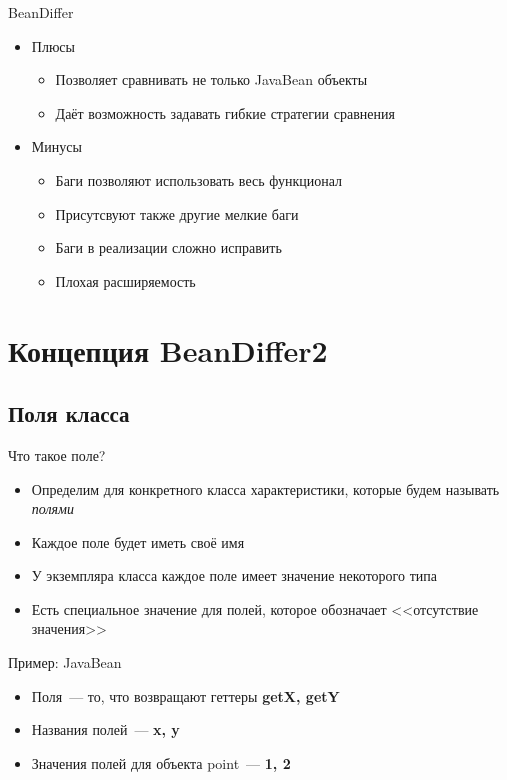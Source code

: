 \documentclass{beamer}
\begin{document}
\begin{frame}{BeanDiffer}
  \pause
  \begin{itemize}
    \item Плюсы
        \pause
        \begin{itemize}
            \item {Позволяет сравнивать не только JavaBean объекты \pause}
            \item {Даёт возможность задавать гибкие стратегии сравнения}
        \end{itemize}
        \pause
    \item Минусы
        \pause
        \begin{itemize}
            \item {Баги позволяют использовать весь функционал \pause}
            \item {Присутсвуют также другие мелкие баги \pause}
            \item {Баги в реализации сложно исправить \pause}
            \item {Плохая расширяемость}
        \end{itemize}
  \end{itemize}
\end{frame}

\section{Концепция BeanDiffer2}

\subsection{Поля класса}

\begin{frame}{Что такое поле?}
  \pause
  \begin{itemize}
      \item {Определим для конкретного класса характеристики, которые будем называть \textit{полями} \pause}
      \item {Каждое поле будет иметь своё имя \pause}
      \item {У экземпляра класса каждое поле имеет значение некоторого типа \pause}
      \item {Есть специальное значение для полей, которое обозначает <<отсутствие значения>>}
  \end{itemize}
\end{frame}

\begin{frame}{Пример: JavaBean}
    \pause
    
    \pause
    \begin{itemize}
        \item {Поля~--- то, что возвращают геттеры \textbf{getX, getY} \pause}
        \item {Названия полей~--- \textbf{x, y} \pause}
        \item {Значения полей для объекта point~--- \textbf{1, 2}}
    \end{itemize}
\end{frame}
\end{document}
